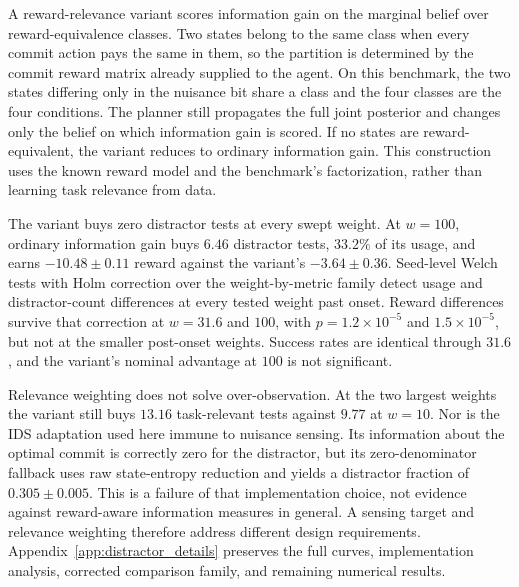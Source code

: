 A reward-relevance variant scores information gain on the marginal belief over reward-equivalence classes. Two states belong to the same class when every commit action pays the same in them, so the partition is determined by the commit reward matrix already supplied to the agent. On this benchmark, the two states differing only in the nuisance bit share a class and the four classes are the four conditions. The planner still propagates the full joint posterior and changes only the belief on which information gain is scored. If no states are reward-equivalent, the variant reduces to ordinary information gain. This construction uses the known reward model and the benchmark's factorization, rather than learning task relevance from data.

The variant buys zero distractor tests at every swept weight. At $w{=}100$, ordinary information gain buys $6.46$ distractor tests, $33.2\%$ of its usage, and earns $-10.48\pm0.11$ reward against the variant's $-3.64\pm0.36$. Seed-level Welch tests with Holm correction over the weight-by-metric family detect usage and distractor-count differences at every tested weight past onset. Reward differences survive that correction at $w{=}31.6$ and $100$, with $p=1.2{\times}10^{-5}$ and $1.5{\times}10^{-5}$, but not at the smaller post-onset weights. Success rates are identical through $31.6$, and the variant's nominal advantage at $100$ is not significant.

Relevance weighting does not solve over-observation. At the two largest weights the variant still buys $13.16$ task-relevant tests against $9.77$ at $w{=}10$. Nor is the IDS adaptation used here immune to nuisance sensing. Its information about the optimal commit is correctly zero for the distractor, but its zero-denominator fallback uses raw state-entropy reduction and yields a distractor fraction of $0.305\pm0.005$. This is a failure of that implementation choice, not evidence against reward-aware information measures in general. A sensing target and relevance weighting therefore address different design requirements. Appendix~\ref{app:distractor_details} preserves the full curves, implementation analysis, corrected comparison family, and remaining numerical results.

